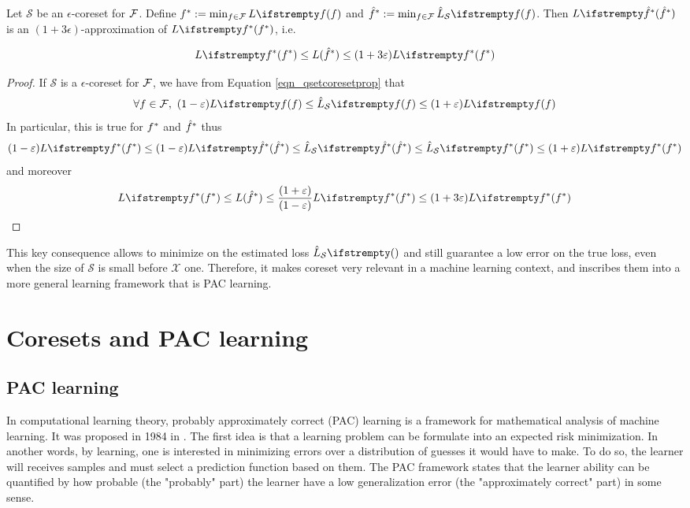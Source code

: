 \begin{theorem}
    Let $\mathcal{S}$ be an $\epsilon$-coreset for $\mathcal{F}$. Define $\query^*:=\min_{\query \in \qset}\loss{\query}$ and $\hat \query^*:=\min_{\query \in \qset}\estloss{\mathcal{S}}{\query}$. Then $\loss{\hat\query^*} $ is an $(1+3\epsilon)$-approximation of $\loss{\query^*}$, i.e.

    \begin{equation*}
        \loss{\query^*} \le {L}( \hat\query^*)\leq (1+ 3 \epsilon)\loss{\query^*}
    \end{equation*}
    \label{thm_optcoreset}
\end{theorem}
\begin{proof}
    If $\mathcal{S}$ is a $\epsilon$-coreset for $\mathcal{F}$, we have from Equation \ref{eqn_qsetcoresetprop} that 
    \begin{equation*}
        \forall \query \in \qset ,\ (1-\epsilon) \loss{\query} \le \estloss{\mathcal{S}}{\query} \le(1+\epsilon) \loss{\query}
    \end{equation*}
    In particular, this is true for $f^*$ and $\hat {f}^*$ thus
    \begin{equation}
        (1-\epsilon) \loss{\query^*} \le(1-\epsilon) \loss{\hat\query^*} \le \estloss{\mathcal{S}}{\hat\query^*} \le \estloss{\mathcal{S}}{\query^*} \le(1+\epsilon) \loss{\query^*}
    \end{equation}
    and moreover
    \begin{equation*}
        \loss{\query^*} \le {L}( \hat\query^*) \le \frac{(1+\epsilon)}{(1-\epsilon) } \loss{\query^*} \leq (1+ 3 \epsilon)\loss{\query^*}
        \end{equation*}
\end{proof}
This key consequence allows to minimize on the estimated loss $\estloss{\mathcal{S}}{}$ and still guarantee a low error on the true loss, even when the size of $\mathcal{S}$ is small before $\mathcal{X}$ one. Therefore, it makes coreset very relevant in a machine learning context, and  inscribes them into a more general learning framework that is PAC learning.

\section{Coresets and PAC learning}
\subsection{PAC learning}In computational learning theory, probably approximately correct (PAC) learning is a framework for mathematical analysis of machine learning. It was proposed in 1984 in \cite{valiant1984learnable}. The first idea is that a learning problem can be formulate into an expected risk minimization. In another words, by learning, one is interested in minimizing errors over a distribution of guesses it would have to make. To do so, the learner will receives samples and must select a prediction function based on them. The PAC framework states that the learner ability can be quantified by how probable (the "probably" part) the learner have a low generalization error (the "approximately correct" part) in some sense.



